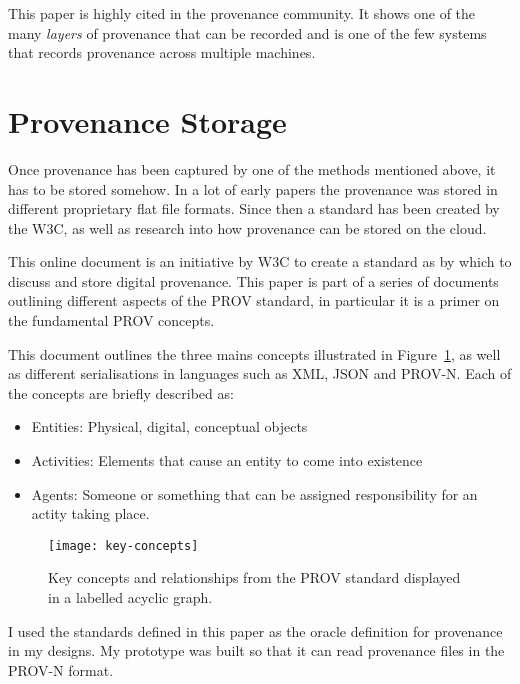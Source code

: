 This paper is highly cited in the provenance community. It shows one of the many \textit{layers} of provenance that can be recorded and is one of the few systems that records provenance across multiple machines. 

\section{Provenance Storage}
\label{sec:provenance_storage}

Once provenance has been captured by one of the methods mentioned above, it has to be stored somehow. In a lot of early papers the provenance was stored in different proprietary flat file formats. Since then a standard has been created by the W3C, as well as research into how provenance can be stored on the cloud.


This online document is an initiative by W3C to create a standard as by which to discuss and store digital provenance. This paper is part of a series of documents outlining different aspects of the PROV standard, in particular it is a primer on the fundamental PROV concepts.

This document outlines the three mains concepts illustrated in Figure~\ref{fig:key-concepts}, as well as different serialisations in languages such as XML, JSON and PROV-N. Each of the concepts are briefly described as:
\begin{itemize}
	\item Entities: Physical, digital, conceptual objects
	\item Activities: Elements that cause an entity to come into existence
	\item Agents: Someone or something that can be assigned responsibility for an actity taking place.  
\end{itemize}

\begin{figure}[h]
	\centering
	\texttt{[image: key-concepts]}
	\caption{Key concepts and relationships from the PROV standard displayed in a labelled acyclic graph.}
	\label{fig:key-concepts}
\end{figure}

I used the standards defined in this paper as the oracle definition for provenance in my designs. My prototype was built so that it can read provenance files in the PROV-N format.


